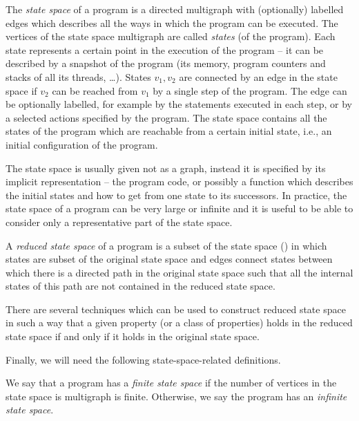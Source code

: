 \begin{definition}
The \emph{state space} of a program is a directed multigraph with (optionally) labelled edges which describes all the ways in which the program can be executed.
The vertices of the state space multigraph are called \emph{states} (of the program).
Each state represents a certain point in the execution of the program -- it can be described by a snapshot of the program (its memory, program counters and stacks of all its threads, …).
States $v_1, v_2$ are connected by an edge in the state space if $v_2$ can be reached from $v_1$ by a single step of the program.
The edge can be optionally labelled, for example by the statements executed in each step, or by a selected actions specified by the program.
The state space contains all the states of the program which are reachable from a certain initial state, i.e., an initial configuration of the program.
\end{definition}

The state space is usually given not as a graph, instead it is specified by its
implicit representation -- the program code, or possibly a function which
describes the initial states and how to get from one state to its successors.
In practice, the state space of a program can be very large or infinite and it
is useful to be able to consider only a representative part of the state space.

\begin{definition}
A \emph{reduced state space} of a program is a subset of the state space () in which states are subset of the original state space and edges connect states between which there is a directed path in the original state space such that all the internal states of this path are not contained in the reduced state space.
\end{definition}

There are several techniques which can be used to construct reduced state space in such a way that a given property (or a class of properties) holds in the reduced state space if and only if it holds in the original state space.

Finally, we will need the following state-space-related definitions.

\begin{definition}
We say that a program has a \emph{finite state space} if the number of vertices in the state space is multigraph is finite.
Otherwise, we say the program has an \emph{infinite state space}.
\end{definition}

